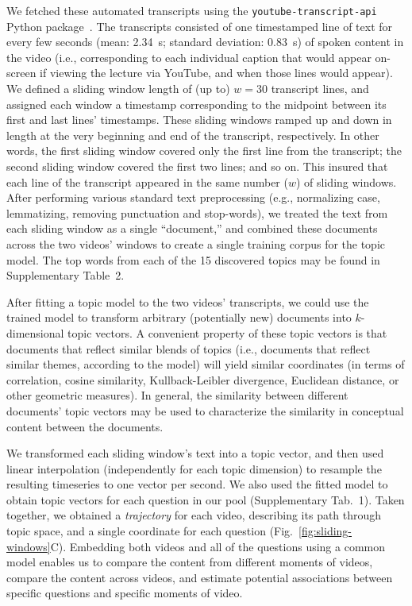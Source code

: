 \documentclass[10pt]{article}
\newcommand{\questions}{1}
\newcommand{\topics}{2}
\begin{document}
We fetched these automated transcripts using the
\texttt{youtube-transcript-api} Python package~\citep{Depo19}. The transcripts
consisted of one timestamped line of text for every few seconds (mean: 2.34~s;
standard deviation: 0.83~s) of spoken content in the video (i.e., corresponding
to each individual caption that would appear on-screen if viewing the lecture
via YouTube, and when those lines would appear). We defined a sliding window
length of (up to) $w = 30$ transcript lines, and assigned each window a
timestamp corresponding to the midpoint between its first and last lines'
timestamps. These sliding windows ramped up and down in length at the very
beginning and end of the transcript, respectively. In other words, the first
sliding window covered only the first line from the transcript; the second
sliding window covered the first two lines; and so on. This insured that each
line of the transcript appeared in the same number ($w$) of sliding windows.
After performing various standard text preprocessing (e.g., normalizing case,
lemmatizing, removing punctuation and stop-words), we treated the text from
each sliding window as a single ``document,'' and combined these documents
across the two videos' windows to create a single training corpus for the topic
model. The top words from each of the 15 discovered topics may be found in
Supplementary Table~\topics.

After fitting a topic model to the two videos' transcripts, we could use the
trained model to transform arbitrary (potentially new) documents into
$k$-dimensional topic vectors. A convenient property of these topic vectors is
that documents that reflect similar blends of topics (i.e., documents that
reflect similar themes, according to the model) will yield similar coordinates
(in terms of correlation, cosine similarity, Kullback-Leibler divergence, Euclidean distance, or other geometric measures). In
general, the similarity between different documents' topic vectors may be used
to characterize the similarity in conceptual content between the documents.

We transformed each sliding window's text into a topic vector, and then used
linear interpolation (independently for each topic dimension) to resample the
resulting timeseries to one vector per second. We also used the fitted model to
obtain topic vectors for each question in our pool (Supplementary Tab.~\questions). Taken
together, we obtained a \textit{trajectory} for each video, describing its path
through topic space, and a single coordinate for each question
(Fig.~\ref{fig:sliding-windows}C). Embedding both videos and all of the
questions using a common model enables us to compare the content from different
moments of videos, compare the content across videos, and estimate potential
associations between specific questions and specific moments of video.
\end{document}
